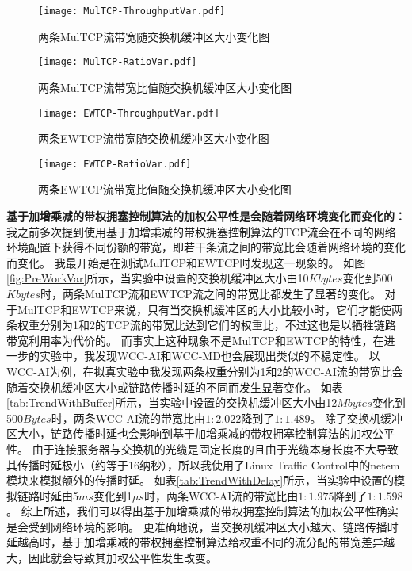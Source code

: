\documentclass[winfonts]{njuthesis}
\begin{document}
\begin{figure*}[ht]
  \begin{subfigure}{.5\textwidth}
    \centering
		\texttt{[image: MulTCP-ThroughputVar.pdf]}
    \label{fig:MulTCP-ThroughputVar}
    \caption{两条MulTCP流带宽随交换机缓冲区大小变化图}
  \end{subfigure}
	\begin{subfigure}{.5\textwidth}
    \centering
		\texttt{[image: MulTCP-RatioVar.pdf]}
    \label{fig:MulTCP-RatioVar}
    \caption{两条MulTCP流带宽比值随交换机缓冲区大小变化图}
  \end{subfigure}	
	\begin{subfigure}{.5\textwidth}
    \centering
		\texttt{[image: EWTCP-ThroughputVar.pdf]}
    \label{fig:EWTCP-ThroughputVar}
    \caption{两条EWTCP流带宽随交换机缓冲区大小变化图}
  \end{subfigure}
	\begin{subfigure}{.5\textwidth}
    \centering
		\texttt{[image: EWTCP-RatioVar.pdf]}
    \label{fig:EWTCP-RatioVar}
    \caption{两条EWTCP流带宽比值随交换机缓冲区大小变化图}
  \end{subfigure}
	\caption{权重分别为1和2的两条MulTCP和EWTCP流的带宽及其比值随交换机缓冲区大小变化图。}
	\label{fig:PreWorkVar}
\end{figure*}

\textbf{基于加增乘减的带权拥塞控制算法的加权公平性是会随着网络环境变化而变化的：}
我之前多次提到使用基于加增乘减的带权拥塞控制算法的TCP流会在不同的网络环境配置下获得不同份额的带宽，即若干条流之间的带宽比会随着网络环境的变化而变化。
我最开始是在测试MulTCP和EWTCP时发现这一现象的。
如图\ref{fig:PreWorkVar}所示，当实验中设置的交换机缓冲区大小由10$Kbytes$变化到500$Kbytes$时，两条MulTCP流和EWTCP流之间的带宽比都发生了显著的变化。
对于MulTCP和EWTCP来说，只有当交换机缓冲区的大小比较小时，它们才能使两条权重分别为1和2的TCP流的带宽比达到它们的权重比，不过这也是以牺牲链路带宽利用率为代价的。
而事实上这种现象不是MulTCP和EWTCP的特性，在进一步的实验中，我发现WCC-AI和WCC-MD也会展现出类似的不稳定性。
以WCC-AI为例，在拟真实验中我发现两条权重分别为1和2的WCC-AI流的带宽比会随着交换机缓冲区大小或链路传播时延的不同而发生显著变化。
如表\ref{tab:TrendWithBuffer}所示，当实验中设置的交换机缓冲区大小由12$Mbytes$变化到500$Bytes$时，两条WCC-AI流的带宽比由$1:2.022$降到了$1:1.489$。
除了交换机缓冲区大小，链路传播时延也会影响到基于加增乘减的带权拥塞控制算法的加权公平性。
由于连接服务器与交换机的光缆是固定长度的且由于光缆本身长度不大导致其传播时延极小（约等于16纳秒），所以我使用了Linux Traffic Control中的netem模块来模拟额外的传播时延。
如表\ref{tab:TrendWithDelay}所示，当实验中设置的模拟链路时延由5$ms$变化到1$\mu s$时，两条WCC-AI流的带宽比由$1:1.975$降到了$1:1.598$。
综上所述，我们可以得出基于加增乘减的带权拥塞控制算法的加权公平性确实是会受到网络环境的影响。
更准确地说，当交换机缓冲区大小越大、链路传播时延越高时，基于加增乘减的带权拥塞控制算法给权重不同的流分配的带宽差异越大，因此就会导致其加权公平性发生改变。
\end{document}

